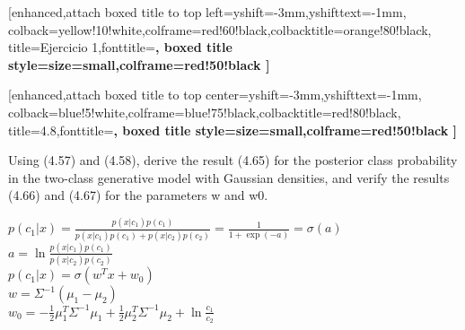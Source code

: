 \documentclass{article}
\begin{document}
\begin {tcolorbox}
	[enhanced,attach boxed title to top left={yshift=-3mm,yshifttext=-1mm}, colback=yellow!10!white,colframe=red!60!black,colbacktitle=orange!80!black, title=Ejercicio 1,fonttitle=\bfseries, boxed title style={size=small,colframe=red!50!black} ]
	
	\begin {tcolorbox}
    [enhanced,attach boxed title to top center={yshift=-3mm,yshifttext=-1mm}, colback=blue!5!white,colframe=blue!75!black,colbacktitle=red!80!black, title=4.8,fonttitle=\bfseries, boxed title style={size=small,colframe=red!50!black} ]
  
Using (4.57) and (4.58), derive the result (4.65) for the posterior class probability in the two-class generative model with Gaussian densities, and verify the results (4.66) and (4.67) for the parameters w and w0.
	\end{tcolorbox}
\end{tcolorbox}

$ \displaystyle
    p\left(c_1|x\right)=\frac{p\left(x|c_1\right)p\left(c_1\right)}{p\left(x|c_1\right)p\left(c_1\right)+p\left(x|c_2\right)p\left(c_2\right)}=\frac{1}{1+\exp{\left(-a\right)}}=\sigma\left(a\right)
$  \\
$ \displaystyle
    a=\ln{
        \frac{p\left(x|c_1\right)p\left(c_1\right)}{p\left(x|c_2\right)p\left(c_2\right)}
    }
$\\
$ \displaystyle
    p\left(c_1|x\right)=\sigma\left(w^Tx+w_0\right)
$\\
$ \displaystyle
    w=\Sigma^{-1}\left(\mu_1-\mu_2\right)
$\\
$\displaystyle
    w_0=-\frac{1}{2}\mu_1^T \Sigma^{-1}\mu_1+\frac{1}{2}\mu_2^T \Sigma^{-1}\mu_2+\ln{\frac{c_1}{c_2}}
$\\
\end{document}

